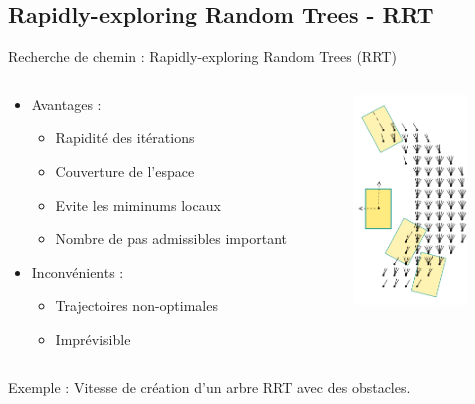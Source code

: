 \documentclass{beamer}
\begin{document}

\subsection{Rapidly-exploring Random Trees - RRT}

\begin{frame}
  \center Recherche de chemin : Rapidly-exploring Random Trees (RRT)
  \begin{columns}
    \begin{column}{7cm}
      \begin{itemize}
      \item Avantages :
        \begin{itemize}
        \item Rapidité des itérations
        \item Couverture de l'espace
        \item Evite les miminums locaux
        \item Nombre de pas admissibles important
        \end{itemize}
        \vspace{3mm}
      \item Inconvénients :
        \begin{itemize}
        \item Trajectoires non-optimales
        \item Imprévisible
        \end{itemize}
      \end{itemize}
    \end{column}

    \begin{column}{4cm}
      \includegraphics[width=3cm]{./images/grid_simple.png}
    \end{column}
  \end{columns}

  \vspace{5mm}
  Exemple : Vitesse de création d'un arbre RRT avec des obstacles.
\end{frame}
\end{document}

